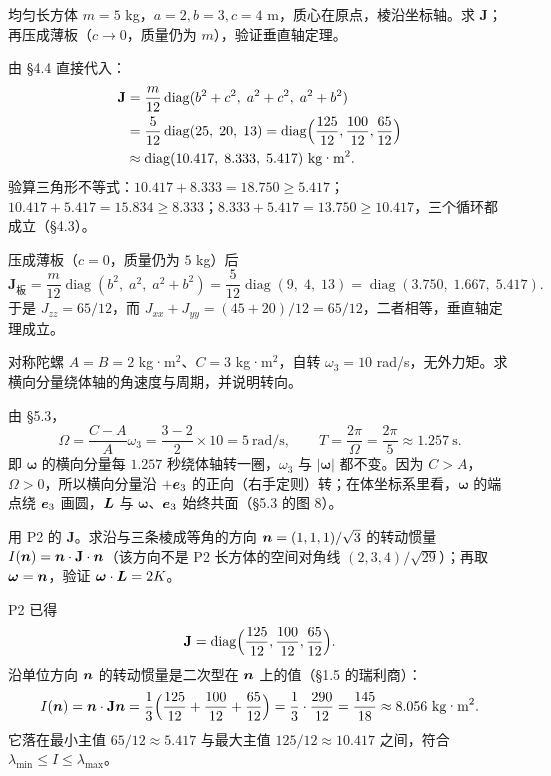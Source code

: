 \documentclass[11pt]{ctexart}
\newcommand{\ten}[1]{\mathbf{#1}}
\begin{document}
{均匀长方体 $m=5$ kg，$a=2,b=3,c=4$ m，质心在原点，棱沿坐标轴。求 $\ten J$；再压成薄板（$c\to0$，质量仍为 $m$），验证垂直轴定理。}

由 \S4.4 直接代入：
\[
\begin{aligned}
\ten J&=\frac{m}{12}\operatorname{diag}(b^2+c^2,\;a^2+c^2,\;a^2+b^2)\\
&=\frac{5}{12}\operatorname{diag}(25,\;20,\;13)
=\operatorname{diag}\Bigl(\frac{125}{12},\frac{100}{12},\frac{65}{12}\Bigr)\\
&\approx\operatorname{diag}(10.417,\;8.333,\;5.417)\ \text{kg·m}^2 .
\end{aligned}
\]
验算三角形不等式：$10.417+8.333=18.750\ge5.417$；$10.417+5.417=15.834\ge8.333$；$8.333+5.417=13.750\ge10.417$，三个循环都成立（\S4.3）。

压成薄板（$c=0$，质量仍为 $5$ kg）后
\[
\ten J_{\text{板}}=\frac{m}{12}\operatorname{diag}(b^2,\;a^2,\;a^2+b^2)
=\frac{5}{12}\operatorname{diag}(9,\;4,\;13)
=\operatorname{diag}(3.750,\;1.667,\;5.417).
\]
于是 $J_{zz}=65/12$，而 $J_{xx}+J_{yy}=(45+20)/12=65/12$，二者相等，垂直轴定理成立。

{对称陀螺 $A=B=2$ kg·m$^2$、$C=3$ kg·m$^2$，自转 $\omega_3=10$ rad/s，无外力矩。求横向分量绕体轴的角速度与周期，并说明转向。}

由 \S5.3，
\[
\Omega=\frac{C-A}{A}\omega_3=\frac{3-2}{2}\times10=5\ \text{rad/s},
\qquad
T=\frac{2\pi}{\Omega}=\frac{2\pi}{5}\approx1.257\ \text{s}.
\]
即 $\boldsymbol\omega$ 的横向分量每 $1.257$ 秒绕体轴转一圈，$\omega_3$ 与 $|\boldsymbol\omega|$ 都不变。因为 $C>A$，$\Omega>0$，所以横向分量沿 $+\boldsymbol{e}_3$ 的正向（右手定则）转；在体坐标系里看，$\boldsymbol\omega$ 的端点绕 $\boldsymbol{e}_3$ 画圆，$\boldsymbol{L}$ 与 $\boldsymbol\omega$、$\boldsymbol{e}_3$ 始终共面（\S5.3 的图 8）。

{用 P2 的 $\ten J$。求沿与三条棱成等角的方向 $\boldsymbol{n}=(1,1,1)/\sqrt3$ 的转动惯量 $I(\vect n)=\vect n\cdot\ten J\cdot\vect n$（该方向不是 P2 长方体的空间对角线 $(2,3,4)/\sqrt{29}$）；再取 $\boldsymbol\omega=\boldsymbol{n}$，验证 $\boldsymbol\omega\cdot\boldsymbol{L}=2K$。}

P2 已得
\[
\ten J=\operatorname{diag}\Bigl(\frac{125}{12},\frac{100}{12},\frac{65}{12}\Bigr).
\]
沿单位方向 $\boldsymbol{n}$ 的转动惯量是二次型在 $\boldsymbol{n}$ 上的值（\S1.5 的瑞利商）：
\[
I(\vect n)=\vect n\cdot\ten J\vect n
=\frac{1}{3}\Bigl(\frac{125}{12}+\frac{100}{12}+\frac{65}{12}\Bigr)
=\frac{1}{3}\cdot\frac{290}{12}
=\frac{145}{18}\approx8.056\ \text{kg·m}^2 .
\]
它落在最小主值 $65/12\approx5.417$ 与最大主值 $125/12\approx10.417$ 之间，符合 $\lambda_{\min}\le I\le\lambda_{\max}$。
\end{document}
